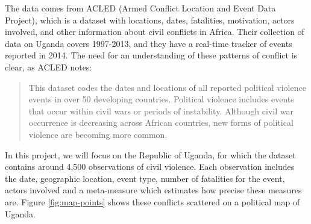 \documentclass{article} %
\begin{document}
The data comes from ACLED (Armed Conflict Location and Event Data Project), which is a dataset with locations, dates, fatalities, motivation, actors involved, and other information about civil conflicts in Africa. Their collection of data on Uganda covers 1997-2013, and they have a real-time tracker of events reported in 2014.\cite{ACLED} The need for an understanding of these patterns of conflict is clear, as ACLED notes:

\begin{quote}
This dataset codes the dates and locations of all reported political violence events in over 50 developing countries. Political violence includes events that occur within civil wars or periods of instability. Although civil war occurrence is decreasing across African countries, new forms of political violence are becoming more common.
\end{quote}

\begin{table}[H]
\caption{The ACLED Uganda Dataset}
\centering
{}
\end{table}


In this project, we will focus on the Republic of Uganda, for which the dataset contains around 4,500 observations of civil violence. Each observation includes the date, geographic location, event type, number of fatalities for the event, actors involved and a meta-measure which estimates how precise these measures are. Figure \ref{fig:map-points} shows these conflicts scattered on a political map of Uganda.
\end{document}
